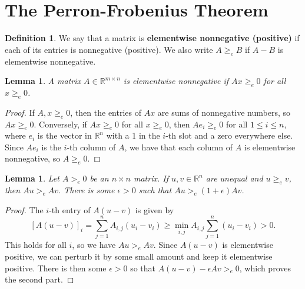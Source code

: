 \documentclass[11pt,letterpaper]{article}
\newcommand{\reals}{\mathbb{R}}
\newtheorem{lemma}[theorem]{Lemma}
\theoremstyle{definition}
\newtheorem{definition}{Definition}[section]
\theoremstyle{remark}
\begin{document}
\section{The Perron-Frobenius Theorem}
\begin{definition}
	We say that a matrix is \textbf{elementwise nonnegative (positive)} if each of its entries is nonnegative (positive). We also write $A\geq_e B$ if $A-B$ is elementwise nonnegative.
\end{definition}

\begin{lemma}
	A matrix $A\in \reals^{m\times n}$ is elementwise nonnegative if $Ax\geq_e 0$ for all $x\geq_e 0$.
\end{lemma}
\begin{proof}
	If $A, x \geq_e 0$, then the entries of $Ax$ are sums of nonnegative numbers, so $Ax \geq_e 0$. Conversely, if $Ax \geq_e 0$ for all $x\geq_e 0$, then $Ae_i \geq_e 0$ for all $1\leq i \leq n$, where $e_i$ is the vector in $\reals^n$ with a 1 in the $i$-th slot and a zero everywhere else. Since $Ae_i$ is the $i$-th column of $A$, we have that each column of $A$ is elementwise nonnegative, so $A \geq_e 0$.
\end{proof}

\begin{lemma}
	Let $A>_e 0$ be an $n\times n$ matrix. If $u, v\in \reals^n$ are unequal and $u\geq_e v$, then $Au >_e Av$. There is some $\epsilon>0$ such that $Au >_e (1+\epsilon)Av$.
\end{lemma}
\begin{proof}
	The $i$-th entry of $A(u-v)$ is given by
	\[
	[A(u-v)]_i = \sum_{j=1}^nA_{i,j}(u_i-v_i) \geq \min_{i,j}A_{i,j}\sum_{j=1}^n(u_i-v_i) > 0.
	\]
	This holds for all $i$, so we have $Au >_e Av$. Since $A(u-v)$ is elementwise positive, we can perturb it by some small amount and keep it elementwise positive. There is then some $\epsilon>0$ so that $A(u-v) - \epsilon Av >_e 0$, which proves the second part.
\end{proof}
\end{document}
